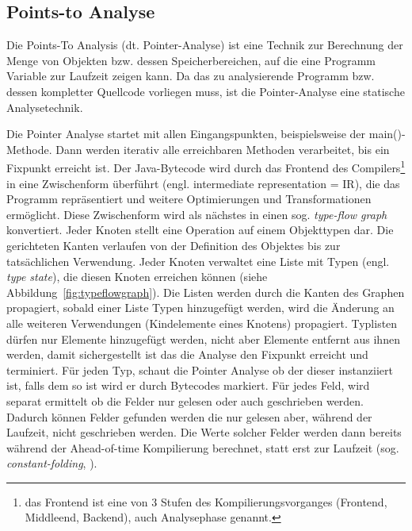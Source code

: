 \subsection{Points-to Analyse}
\label{subsec:pointsto}

Die Points-To Analysis (dt. Pointer-Analyse) ist eine Technik zur Berechnung der Menge von Objekten bzw. dessen Speicherbereichen, auf die eine Programm Variable zur Laufzeit zeigen kann\parencite{Hind2001, Smaragdakis2015}. Da das zu analysierende Programm bzw. dessen kompletter Quellcode vorliegen muss, ist die Pointer-Analyse eine statische Analysetechnik.

Die Pointer Analyse startet mit allen Eingangspunkten, beispielsweise der main()-Methode. Dann werden iterativ alle erreichbaren Methoden verarbeitet, bis ein Fixpunkt erreicht ist. Der Java-Bytecode wird durch das Frontend des Compilers\footnote{das Frontend ist eine von 3 Stufen des Kompilierungsvorganges (Frontend, Middleend, Backend), auch Analysephase genannt.} in eine Zwischenform überführt (engl. intermediate representation = IR), die das Programm repräsentiert und weitere Optimierungen und Transformationen ermöglicht\parencite{Simon2015}. 
Diese Zwischenform wird als nächstes in einen sog. \textit{type-flow graph} konvertiert. Jeder Knoten stellt eine Operation auf einem Objekttypen dar. Die gerichteten Kanten verlaufen von der Definition des Objektes bis zur tatsächlichen Verwendung. Jeder Knoten verwaltet eine Liste mit Typen (engl. \textit{type state}), die diesen Knoten erreichen können (siehe Abbildung~\ref{fig:typeflowgraph}). 
Die Listen werden durch die Kanten des Graphen propagiert, sobald einer Liste Typen hinzugefügt werden, wird die Änderung an alle weiteren Verwendungen (Kindelemente eines Knotens) propagiert. Typlisten dürfen nur Elemente hinzugefügt werden, nicht aber Elemente entfernt aus ihnen werden, damit sichergestellt ist das die Analyse den Fixpunkt erreicht und terminiert. Für jeden Typ, schaut die Pointer Analyse ob der dieser instanziiert ist, falls dem so ist wird er durch Bytecodes markiert. Für jedes Feld, wird separat ermittelt ob die Felder nur gelesen oder auch geschrieben werden. Dadurch können Felder gefunden werden die nur gelesen aber, während der Laufzeit, nicht geschrieben werden. Die Werte solcher Felder werden dann bereits während der Ahead-of-time Kompilierung berechnet, statt erst zur Laufzeit (sog. \textit{constant-folding}, \parencite[Kapitel 4.2]{Grumberg2014}).

